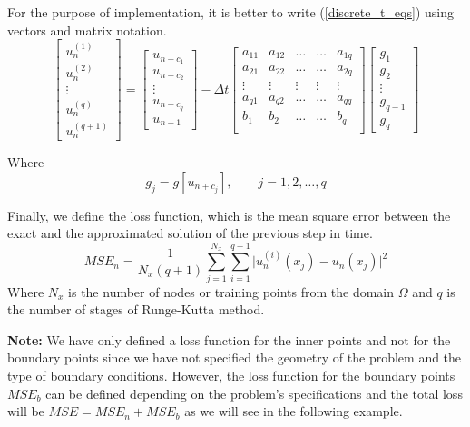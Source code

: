 \documentclass[a4paper,12pt]{article}
\theoremstyle{definition}
\begin{document}
For the purpose of implementation, it is better to write (\ref{discrete_t_eqs}) using vectors and 
matrix notation.
\begin{equation}
\begin{bmatrix}
    u_{n}^{(1)} \\ u_n^{(2)} \\ \vdots \\ u_n^{(q)} \\ u_n^{(q+1)}   
\end{bmatrix}
=
\begin{bmatrix}
u_{n+c_1} \\ u_{n+c_2} \\ \vdots \\ u_{n+c_q} \\ u_{n+1}
\end{bmatrix}
-
\Delta t
\begin{bmatrix}
    a_{11} & a_{12} & \dots & \dots & a_{1q} \\
    a_{21} & a_{22} & \dots & \dots & a_{2q} \\
    \vdots & \vdots & \vdots & \vdots & \vdots \\
    a_{q1} & a_{q2} & \dots & \dots & a_{qq} \\
    b_{1} & b_{2} & \dots & \dots & b_{q} \\
\end{bmatrix}
\begin{bmatrix}
g_1 \\ g_2 \\ \vdots \\ g_{q-1} \\ g_{q}
\end{bmatrix}
\end{equation}

Where 
$$g_j = g[u_{n+c_j}], \qquad  j = 1, 2, \dots, q$$

Finally, we define the loss function, which is the mean square error between the exact and the approximated 
solution of the previous step in time.
\begin{equation}
MSE_{n} = \frac{1}{N_x (q+1)} \sum_{j=1}^{N_x} \sum_{i=1}^{q+1} \Big| u_n^{(i)}(x_j) - u_n(x_j) \Big|^2
\end{equation}
Where $N_x$ is the number of nodes or training points from the domain $\Omega$ and $q$ is the number 
of stages of Runge-Kutta method.

\textbf{Note:} We have only defined a loss function for the inner points and not for the boundary
points since we have not specified the geometry of the problem and the type of boundary conditions.
However, the loss function for the boundary points $MSE_b$ can be defined depending on 
the problem's specifications and the total loss will be $MSE = MSE_n + MSE_b$ as we will see in the following 
example.  
\end{document}
